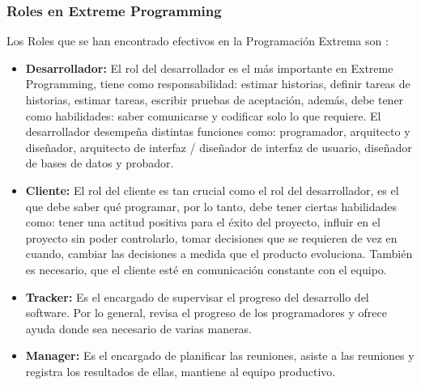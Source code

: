 \subsubsection{Roles en Extreme Programming} 
Los Roles que se han encontrado efectivos en la Programación Extrema son \cite{Canos2003}: 
\begin{itemize}
\item\textbf{Desarrollador: } El rol del desarrollador es el más importante en Extreme Programming, tiene como responsabilidad: estimar historias, definir tareas de historias, estimar tareas, escribir pruebas de aceptación, además, debe tener como habilidades: saber comunicarse y codificar solo lo que requiere. El desarrollador desempeña distintas funciones como: programador, arquitecto y diseñador, arquitecto de interfaz / diseñador de interfaz de usuario, diseñador de bases de datos y probador. 

\item\textbf{Cliente:} El rol del cliente es tan crucial como el rol del desarrollador, es el que debe saber qué programar, por lo tanto, debe tener ciertas habilidades como: tener una actitud positiva para el éxito del proyecto, influir en el proyecto sin poder controlarlo, tomar decisiones que se requieren de vez en cuando, cambiar las decisiones a medida que el producto evoluciona. También es necesario, que el cliente esté en comunicación constante con el equipo.

\item\textbf{Tracker:} Es el encargado de supervisar el progreso del desarrollo del software. Por lo general, revisa el progreso de los programadores y ofrece ayuda donde sea necesario de varias maneras.

\item\textbf{Manager:} Es el encargado de planificar las reuniones, asiste a las reuniones y registra los resultados de ellas, mantiene al equipo productivo. 

\end{itemize}